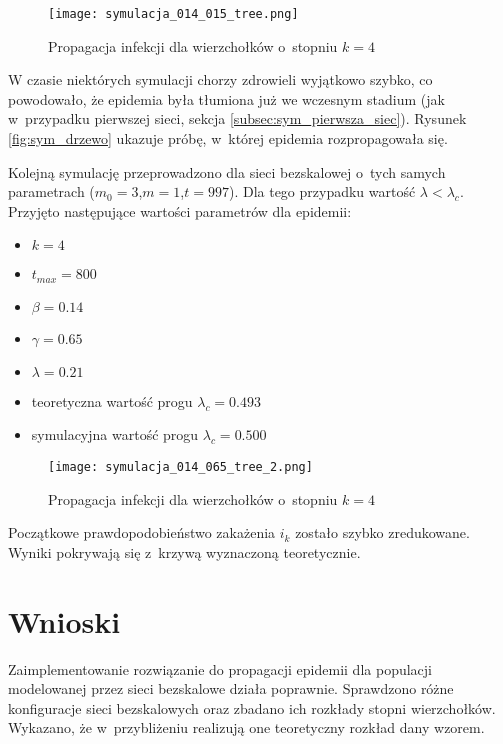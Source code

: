 \begin{enumerate}
\begin{figure}[H]
\centering
\texttt{[image: symulacja\_014\_015\_tree.png]}
\caption{\small Propagacja infekcji dla wierzchołków o~stopniu $k=4$}
\label{fig:symulacja_014_015_tree}
\end{figure}

W czasie niektórych symulacji chorzy zdrowieli wyjątkowo szybko, co powodowało, że epidemia była tłumiona już we wczesnym stadium (jak w~przypadku pierwszej sieci, sekcja \ref{subsec:sym_pierwsza_siec}). Rysunek \ref{fig:sym_drzewo} ukazuje próbę, w~której epidemia rozpropagowała się.

Kolejną symulację przeprowadzono dla sieci bezskalowej o~tych samych parametrach ($m_0 = 3$,$m = 1$,$t = 997$). Dla tego przypadku wartość $\lambda < \lambda_c$. Przyjęto następujące wartości parametrów dla epidemii:
\begin{itemize}[nolistsep]
\item $k = 4$
\item $t_{max} = 800$
\item $\beta = 0.14$
\item $\gamma = 0.65$
\item \textbf{$\lambda = 0.21$}
\item teoretyczna wartość progu $\lambda_c = 0.493$
\item symulacyjna wartość progu $\lambda_c = 0.500$
\end{itemize}

\begin{figure}[H]
\centering
\texttt{[image: symulacja\_014\_065\_tree\_2.png]}
\caption{\small Propagacja infekcji dla wierzchołków o~stopniu $k=4$}
\label{fig:symulacja_014_065_tree}
\end{figure}

Początkowe prawdopodobieństwo zakażenia $i_k$ zostało szybko zredukowane. Wyniki pokrywają się z~krzywą wyznaczoną teoretycznie.


\section{Wnioski}
\label{sec:wnioski}

Zaimplementowanie rozwiązanie do propagacji epidemii dla populacji modelowanej przez sieci bezskalowe działa poprawnie. Sprawdzono różne konfiguracje sieci bezskalowych oraz zbadano ich rozkłady stopni wierzchołków. Wykazano, że w~przybliżeniu realizują one teoretyczny rozkład dany wzorem. 


\end{enumerate}
